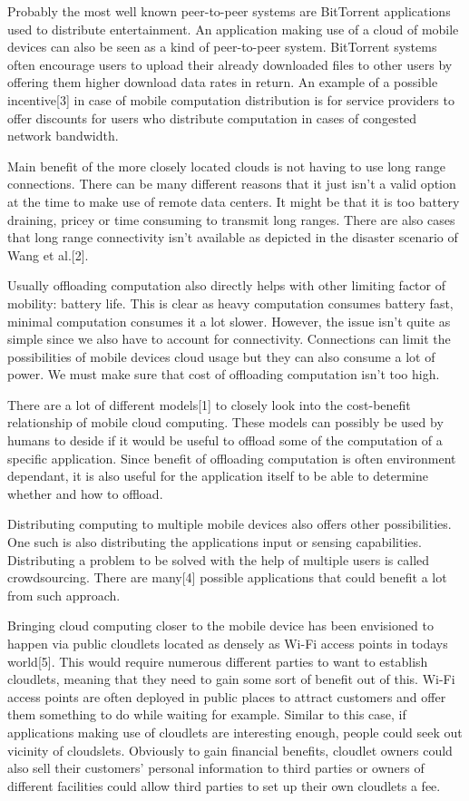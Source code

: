\documentclass[conference]{IEEEtran}
\begin{document}
\par
Probably the most well known peer-to-peer systems are BitTorrent applications used to distribute entertainment. An application making use of a cloud of mobile devices can also be seen as a kind of peer-to-peer system. BitTorrent systems often encourage users to upload their already downloaded files to other users by offering them higher download data rates in return. An example of a possible incentive[3] in case of mobile computation distribution is for service providers to offer discounts for users who distribute computation in cases of congested network bandwidth. 
\par
Main benefit of the more closely located clouds is not having to use long range connections. There can be many different reasons that it just isn't a valid option at the time to make use of remote data centers. It might be that it is too battery draining, pricey or time consuming to transmit long ranges. There are also cases that long range connectivity isn't available as depicted in the disaster scenario of Wang et al.[2].
\par
Usually offloading computation also directly helps with other limiting factor of mobility: battery life. This is clear as heavy computation consumes battery fast, minimal computation consumes it a lot slower. However, the issue isn't quite as simple since we also have to account for connectivity. Connections can limit the possibilities of mobile devices cloud usage but they can also consume a lot of power. We must make sure that cost of offloading computation isn't too high.
\par
There are a lot of different models[1] to closely look into the cost-benefit relationship of mobile cloud computing. These models can possibly be used by humans to deside if it would be useful to offload some of the computation of a specific application. Since benefit of offloading computation is often environment dependant, it is also useful for the application itself to be able to determine whether and how to offload.
\par
Distributing computing to multiple mobile devices also offers other possibilities. One such is also distributing the applications input or sensing capabilities. Distributing a problem to be solved with the help of multiple users is called crowdsourcing. There are many[4] possible applications that could benefit a lot from such approach.
\par
Bringing cloud computing closer to the mobile device has been envisioned to happen via public cloudlets located as densely as Wi-Fi access points in todays world[5]. This would require numerous different parties to want to establish cloudlets, meaning that they need to gain some sort of benefit out of this. Wi-Fi access points are often deployed in public places to attract customers and offer them something to do while waiting for example. Similar to this case, if applications making use of cloudlets are interesting enough, people could seek out vicinity of cloudslets. Obviously to gain financial benefits, cloudlet owners could also sell their customers' personal information to third parties or owners of different facilities could allow third parties to set up their own cloudlets a fee.
\end{document}
